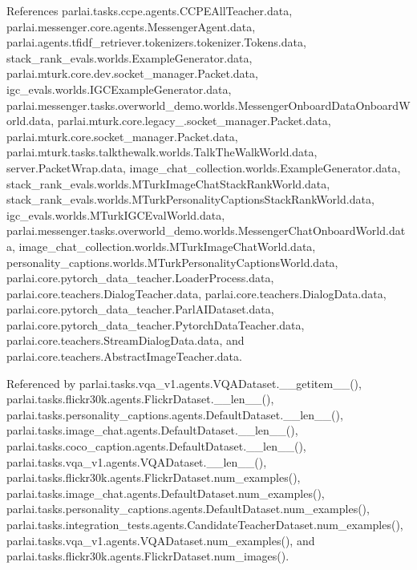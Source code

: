References parlai.\+tasks.\+ccpe.\+agents.\+C\+C\+P\+E\+All\+Teacher.\+data, parlai.\+messenger.\+core.\+agents.\+Messenger\+Agent.\+data, parlai.\+agents.\+tfidf\+\_\+retriever.\+tokenizers.\+tokenizer.\+Tokens.\+data, stack\+\_\+rank\+\_\+evals.\+worlds.\+Example\+Generator.\+data, parlai.\+mturk.\+core.\+dev.\+socket\+\_\+manager.\+Packet.\+data, igc\+\_\+evals.\+worlds.\+I\+G\+C\+Example\+Generator.\+data, parlai.\+messenger.\+tasks.\+overworld\+\_\+demo.\+worlds.\+Messenger\+Onboard\+Data\+Onboard\+World.\+data, parlai.\+mturk.\+core.\+legacy\+\_.\+socket\+\_\+manager.\+Packet.\+data, parlai.\+mturk.\+core.\+socket\+\_\+manager.\+Packet.\+data, parlai.\+mturk.\+tasks.\+talkthewalk.\+worlds.\+Talk\+The\+Walk\+World.\+data, server.\+Packet\+Wrap.\+data, image\+\_\+chat\+\_\+collection.\+worlds.\+Example\+Generator.\+data, stack\+\_\+rank\+\_\+evals.\+worlds.\+M\+Turk\+Image\+Chat\+Stack\+Rank\+World.\+data, stack\+\_\+rank\+\_\+evals.\+worlds.\+M\+Turk\+Personality\+Captions\+Stack\+Rank\+World.\+data, igc\+\_\+evals.\+worlds.\+M\+Turk\+I\+G\+C\+Eval\+World.\+data, parlai.\+messenger.\+tasks.\+overworld\+\_\+demo.\+worlds.\+Messenger\+Chat\+Onboard\+World.\+data, image\+\_\+chat\+\_\+collection.\+worlds.\+M\+Turk\+Image\+Chat\+World.\+data, personality\+\_\+captions.\+worlds.\+M\+Turk\+Personality\+Captions\+World.\+data, parlai.\+core.\+pytorch\+\_\+data\+\_\+teacher.\+Loader\+Process.\+data, parlai.\+core.\+teachers.\+Dialog\+Teacher.\+data, parlai.\+core.\+teachers.\+Dialog\+Data.\+data, parlai.\+core.\+pytorch\+\_\+data\+\_\+teacher.\+Parl\+A\+I\+Dataset.\+data, parlai.\+core.\+pytorch\+\_\+data\+\_\+teacher.\+Pytorch\+Data\+Teacher.\+data, parlai.\+core.\+teachers.\+Stream\+Dialog\+Data.\+data, and parlai.\+core.\+teachers.\+Abstract\+Image\+Teacher.\+data.



Referenced by parlai.\+tasks.\+vqa\+\_\+v1.\+agents.\+V\+Q\+A\+Dataset.\+\_\+\+\_\+getitem\+\_\+\+\_\+(), parlai.\+tasks.\+flickr30k.\+agents.\+Flickr\+Dataset.\+\_\+\+\_\+len\+\_\+\+\_\+(), parlai.\+tasks.\+personality\+\_\+captions.\+agents.\+Default\+Dataset.\+\_\+\+\_\+len\+\_\+\+\_\+(), parlai.\+tasks.\+image\+\_\+chat.\+agents.\+Default\+Dataset.\+\_\+\+\_\+len\+\_\+\+\_\+(), parlai.\+tasks.\+coco\+\_\+caption.\+agents.\+Default\+Dataset.\+\_\+\+\_\+len\+\_\+\+\_\+(), parlai.\+tasks.\+vqa\+\_\+v1.\+agents.\+V\+Q\+A\+Dataset.\+\_\+\+\_\+len\+\_\+\+\_\+(), parlai.\+tasks.\+flickr30k.\+agents.\+Flickr\+Dataset.\+num\+\_\+examples(), parlai.\+tasks.\+image\+\_\+chat.\+agents.\+Default\+Dataset.\+num\+\_\+examples(), parlai.\+tasks.\+personality\+\_\+captions.\+agents.\+Default\+Dataset.\+num\+\_\+examples(), parlai.\+tasks.\+integration\+\_\+tests.\+agents.\+Candidate\+Teacher\+Dataset.\+num\+\_\+examples(), parlai.\+tasks.\+vqa\+\_\+v1.\+agents.\+V\+Q\+A\+Dataset.\+num\+\_\+examples(), and parlai.\+tasks.\+flickr30k.\+agents.\+Flickr\+Dataset.\+num\+\_\+images().

